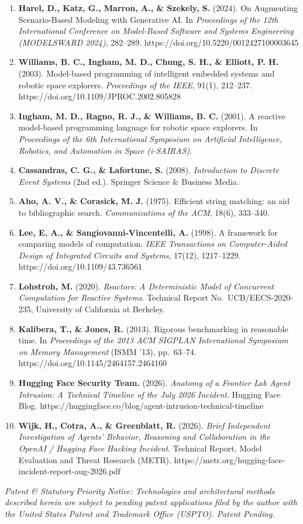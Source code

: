 \documentclass[
  10pt,letterpaper]{article}
\begin{document}
{\begin{enumerate}
  Language Models from Human Preferences. \emph{arXiv preprint
  arXiv:1909.08593}. https://doi.org/10.48550/arXiv.1909.08593
\item
  \textbf{Harel, D., Katz, G., Marron, A., \& Szekely, S.} (2024). On
  Augmenting Scenario-Based Modeling with Generative AI. In
  \emph{Proceedings of the 12th International Conference on Model-Based
  Software and Systems Engineering (MODELSWARD 2024)}, 282--289.
  https://doi.org/10.5220/0012427100003645
\item
  \textbf{Williams, B. C., Ingham, M. D., Chung, S. H., \& Elliott, P.
  H.} (2003). Model-based programming of intelligent embedded systems
  and robotic space explorers. \emph{Proceedings of the IEEE}, 91(1),
  212--237. https://doi.org/10.1109/JPROC.2002.805828
\item
  \textbf{Ingham, M. D., Ragno, R. J., \& Williams, B. C.} (2001). A
  reactive model-based programming language for robotic space explorers.
  In \emph{Proceedings of the 6th International Symposium on Artificial
  Intelligence, Robotics, and Automation in Space (i-SAIRAS)}.
\item
  \textbf{Cassandras, C. G., \& Lafortune, S.} (2008).
  \emph{Introduction to Discrete Event Systems} (2nd ed.). Springer
  Science \& Business Media.
\item
  \textbf{Aho, A. V., \& Corasick, M. J.} (1975). Efficient string
  matching: an aid to bibliographic search. \emph{Communications of the
  ACM}, 18(6), 333--340.
\item
  \textbf{Lee, E. A., \& Sangiovanni-Vincentelli, A.} (1998). A
  framework for comparing models of computation. \emph{IEEE Transactions
  on Computer-Aided Design of Integrated Circuits and Systems}, 17(12),
  1217--1229. https://doi.org/10.1109/43.736561
\item
  \textbf{Lohstroh, M.} (2020). \emph{Reactors: A Deterministic Model of
  Concurrent Computation for Reactive Systems}. Technical Report
  No.~UCB/EECS-2020-235, University of California at Berkeley.
\item
  \textbf{Kalibera, T., \& Jones, R.} (2013). Rigorous benchmarking in
  reasonable time. In \emph{Proceedings of the 2013 ACM SIGPLAN
  International Symposium on Memory Management} (ISMM '13), pp.~63--74.
  https://doi.org/10.1145/2464157.2464160
\item
  \textbf{Hugging Face Security Team.} (2026). \emph{Anatomy of a
  Frontier Lab Agent Intrusion: A Technical Timeline of the July 2026
  Incident}. Hugging Face Blog.
  https://huggingface.co/blog/agent-intrusion-technical-timeline
\item
  \textbf{Wijk, H., Cotra, A., \& Greenblatt, R.} (2026). \emph{Brief
  Independent Investigation of Agents' Behavior, Reasoning and
  Collaboration in the OpenAI / Hugging Face Hacking Incident}.
  Technical Report, Model Evaluation and Threat Research (METR).
  https://metr.org/hugging-face-incident-report-aug-2026.pdf
\end{enumerate}
}

\emph{Patent \& Statutory Priority Notice: Technologies and
architectural methods described herein are subject to pending patent
applications filed by the author with the United States Patent and
Trademark Office (USPTO). Patent Pending.}
\end{document}
